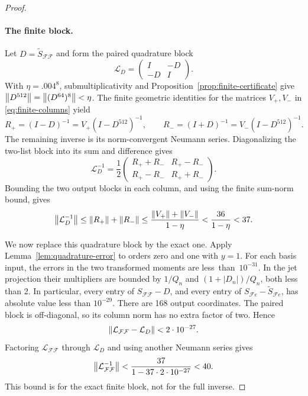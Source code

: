 \begin{proof}
\paragraph{The finite block.}
Let \(D=\widetilde S_{\mathcal F\mathcal F}\) and form the paired quadrature
block
\[
 \mathcal L_D=\begin{pmatrix}I&-D\\-D&I\end{pmatrix}.
\]
With \(\eta=.004^8\), submultiplicativity and
Proposition~\ref{prop:finite-certificate} give
\(\left\lVert D^{512}\right\rVert=\left\lVert(D^{64})^8\right\rVert<\eta\).  The finite geometric identities for the matrices
\(V_+,V_-\) in \eqref{eq:finite-columns} yield
\[
 R_+=(I-D)^{-1}=V_+(I-D^{512})^{-1},\qquad
 R_-=(I+D)^{-1}=V_-(I-D^{512})^{-1}.
\]
The remaining inverse is its norm-convergent Neumann series.  Diagonalizing
the two-list block into its sum and difference gives
\[
 \mathcal L_D^{-1}=\frac12
 \begin{pmatrix}
 R_++R_-&R_+-R_-\\
 R_+-R_-&R_++R_-
 \end{pmatrix}.
\]
Bounding the two output blocks in each column, and using the finite sum-norm
bound, gives
\begin{equation}
 \left\lVert\mathcal L_D^{-1}\right\rVert
 \le\left\lVert R_+\right\rVert+\left\lVert R_-\right\rVert
 \le\frac{\left\lVert V_+\right\rVert+\left\lVert V_-\right\rVert}{1-\eta}
 <\frac{36}{1-\eta}<37.
 \label{eq:finite-quadrature-inverse}
\end{equation}

We now replace this quadrature block by the exact one.  Apply
Lemma~\ref{lem:quadrature-error} to orders zero and one with \(y=1\).
For each basis input, the errors in the two transformed moments are less~than~\(10^{-31}\).
In the jet projection their multipliers are bounded by
\(1/Q_n\) and \((1+|D_n|)/Q_n\), both less than 2.  In particular, every
entry of \(S_{\mathcal F\mathcal F}-D\), and every entry of
\(S_{\mathcal F e}-\widetilde S_{\mathcal F e}\), has absolute value less
than \(10^{-29}\).  There are 168 output coordinates.  The paired block is
off-diagonal, so its column norm has no extra factor of two.  Hence
\begin{equation}
 \left\lVert\mathcal L_{\mathcal F\mathcal F}-\mathcal L_D\right\rVert
 <2\cdot10^{-27}.
 \label{eq:finite-operator-perturbation}
\end{equation}
Factoring \(\mathcal L_{\mathcal F\mathcal F}\) through \(\mathcal L_D\) and
using another Neumann series gives
\begin{equation}
 \left\lVert\mathcal L_{\mathcal F\mathcal F}^{-1}\right\rVert
 <\frac{37}{1-37\cdot2\cdot10^{-27}}<40.
 \label{eq:finite-exact-inverse}
\end{equation}
This bound is for the exact finite block, not for the full inverse.


\end{proof}
